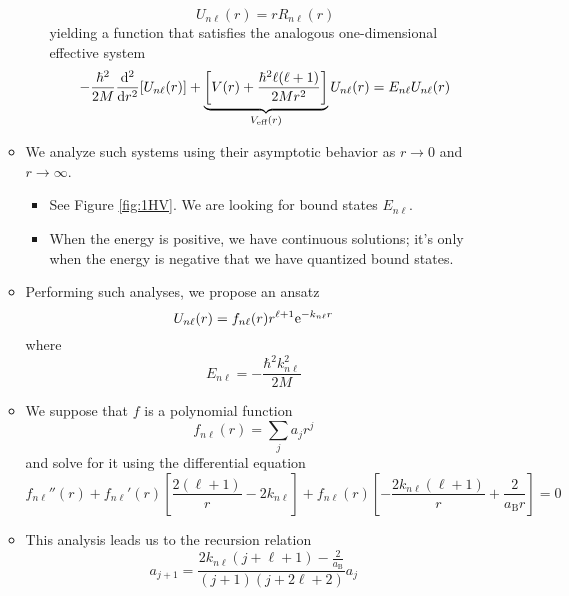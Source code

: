 \documentclass[../notes.tex]{subfiles}
\begin{document}
\begin{itemize}
\begin{itemize}
\begin{itemize}
            \begin{equation*}
                U_{n\ell}(r) = rR_{n\ell}(r)
            \end{equation*}
            yielding a function that satisfies the analogous one-dimensional effective system
            \begin{equation*}
                -\frac{\hbar^2}{2M}\dv[2]{r}[U_{n\ell}(r)]+\underbrace{\left[ V(r)+\frac{\hbar^2\ell(\ell+1)}{2Mr^2} \right]}_{V_\text{eff}(r)}U_{n\ell}(r) = E_{n\ell}U_{n\ell}(r)
            \end{equation*}
        \end{itemize}
        \item We analyze such systems using their asymptotic behavior as $r\to 0$ and $r\to\infty$.
        \begin{itemize}
            \item See Figure \ref{fig:1HV}. We are looking for bound states $E_{n\ell}$.
            \item When the energy is positive, we have continuous solutions; it's only when the energy is negative that we have quantized bound states.
        \end{itemize}
        \item Performing such analyses, we propose an ansatz
        \begin{equation*}
            U_{n\ell}(r) = f_{n\ell}(r)r^{\ell+1}\e[-k_{n\ell}r]
        \end{equation*}
        where
        \begin{equation*}
            E_{n\ell} = -\frac{\hbar^2k_{n\ell}^2}{2M}
        \end{equation*}
        \item We suppose that $f$ is a polynomial function
        \begin{equation*}
            f_{n\ell}(r) = \sum_ja_jr^j
        \end{equation*}
        and solve for it using the differential equation
        \begin{equation*}
            f_{n\ell}''(r)+f_{n\ell}'(r)\left[ \frac{2(\ell+1)}{r}-2k_{n\ell} \right]+f_{n\ell}(r)\left[ -\frac{2k_{n\ell}(\ell+1)}{r}+\frac{2}{a_\text{B}r} \right] = 0
        \end{equation*}
        \item This analysis leads us to the recursion relation
        \begin{equation*}
            a_{j+1} = \frac{2k_{n\ell}(j+\ell+1)-\frac{2}{a_\text{B}}}{(j+1)(j+2\ell+2)}a_j

\end{equation*}
\end{itemize}
\end{itemize}
\end{document}
